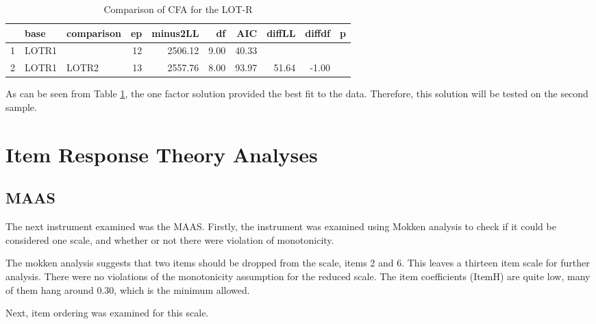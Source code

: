 \documentclass{article}
\begin{document}
\begin{table}[ht]
\centering
\begin{tabular}{rllrrrrrrr}
  \hline
 & base & comparison & ep & minus2LL & df & AIC & diffLL & diffdf & p \\ 
  \hline
1 & LOTR1 &  &  12 & 2506.12 & 9.00 & 40.33 &  &  &  \\ 
  2 & LOTR1 & LOTR2 &  13 & 2557.76 & 8.00 & 93.97 & 51.64 & -1.00 &  \\ 
   \hline
\end{tabular}
\caption{Comparison of CFA for the LOT-R} 
\label{tab:semlotrcomp}
\end{table}
As can be seen from Table \ref{tab:semlotrcomp}, the one factor solution provided the best fit to the data.  Therefore, this solution will be tested on the second sample.

 \section{Item Response Theory Analyses}
\label{sec:item-response-theory}


\subsection{MAAS}
\label{sec:maas}



The next instrument examined was the MAAS.  Firstly, the instrument was examined using Mokken analysis to check if it could be considered one scale, and whether or not there were violation of monotonicity.


The mokken analysis suggests that two items should be dropped from the scale, items 2 and 6. This leaves a thirteen item scale for further analysis. There were no violations of the monotonicity assumption for the reduced scale. The item coefficients (ItemH) are quite low, many of them hang around 0.30, which is the minimum allowed. 


Next, item ordering was examined for this scale.









\end{document}
